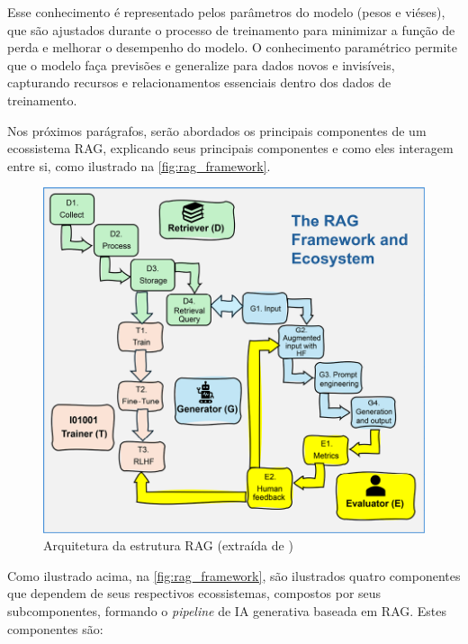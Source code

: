\documentclass[a4paper, 12pt]{article}
\newcommand{\citeb}[1]{\bibleftbracket\cite{#1}\bibrightbracket}
\begin{document}
    Esse conhecimento é representado pelos parâmetros do modelo (pesos e viéses), que são ajustados durante o processo de treinamento para minimizar a função de perda e melhorar o desempenho do modelo. O conhecimento paramétrico permite que o modelo faça previsões e generalize para dados novos e invisíveis, capturando recursos e relacionamentos essenciais dentro dos dados de treinamento.
    
    Nos próximos parágrafos, serão abordados os principais componentes de um ecossistema RAG, explicando seus principais componentes e como eles interagem entre si, como ilustrado na \autoref{fig:rag_framework}.

    \begin{figure}[ht]
        \includegraphics[width=\textwidth,height=0.9\textheight,keepaspectratio]{rag-framework-ecosystem-denis-rothman.png}
        \centering
        \caption{Arquitetura da estrutura RAG (extraída de \citeb{rothman})}
        \centering
        \label{fig:rag_framework}
    \end{figure}

    Como ilustrado acima, na \autoref{fig:rag_framework}, são ilustrados quatro componentes que dependem de seus respectivos ecossistemas, compostos por seus subcomponentes, formando o \textit{pipeline} de IA generativa baseada em RAG. Estes componentes são: 
    
\end{document}
